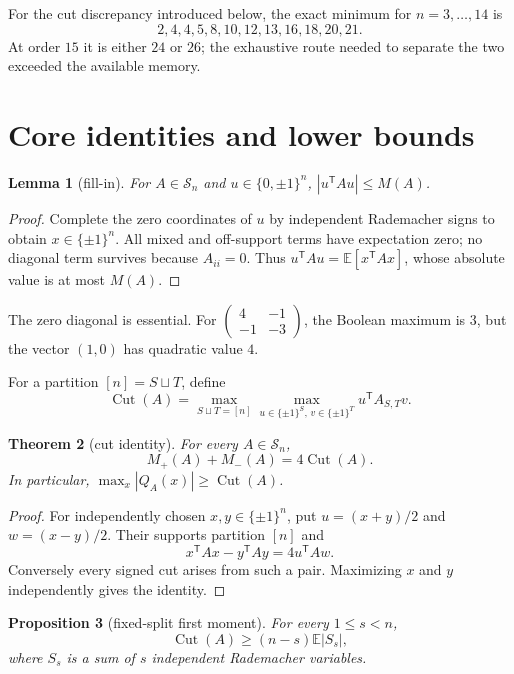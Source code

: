 \documentclass[11pt]{article}
\newtheorem{theorem}{Theorem}[section]
\newtheorem{proposition}[theorem]{Proposition}
\newtheorem{lemma}[theorem]{Lemma}
\theoremstyle{definition}
\theoremstyle{remark}
\newcommand{\Sn}{\mathcal S_n}
\newcommand{\E}{\mathbb E}
\newcommand{\Cut}{\operatorname{Cut}}
\begin{document}
For the cut discrepancy introduced below, the exact minimum for
$n=3,\ldots,14$ is
\[
 2,4,4,5,8,10,12,13,16,18,20,21.
\]
At order $15$ it is either $24$ or $26$; the exhaustive route needed to
separate the two exceeded the available memory.

\section{Core identities and lower bounds}

\begin{lemma}[fill-in]\label{lem:fill-in}
For $A\in\Sn$ and $u\in\{0,\pm1\}^n$,
$|u^{\mathsf T}Au|\le M(A)$.
\end{lemma}

\begin{proof}
Complete the zero coordinates of $u$ by independent Rademacher signs to
obtain $x\in\{\pm1\}^n$.  All mixed and off-support terms have expectation
zero; no diagonal term survives because $A_{ii}=0$.  Thus
$u^{\mathsf T}Au=\E[x^{\mathsf T}Ax]$, whose absolute value is at most
$M(A)$.
\end{proof}

The zero diagonal is essential.  For
$\left(\begin{smallmatrix}4&-1\\-1&-3\end{smallmatrix}\right)$, the Boolean
maximum is $3$, but the vector $(1,0)$ has quadratic value $4$.

For a partition $[n]=S\sqcup T$, define
\[
 \Cut(A)=\max_{S\sqcup T=[n]}
 \max_{u\in\{\pm1\}^S,\,v\in\{\pm1\}^T}
 u^{\mathsf T}A_{S,T}v.
\]

\begin{theorem}[cut identity]\label{thm:cut-identity}
For every $A\in\Sn$,
\[
 M_+(A)+M_-(A)=4\Cut(A).
\]
In particular,
$\max_x|Q_A(x)|\ge\Cut(A)$.
\end{theorem}

\begin{proof}
For independently chosen $x,y\in\{\pm1\}^n$, put
$u=(x+y)/2$ and $w=(x-y)/2$.  Their supports partition $[n]$ and
\[
 x^{\mathsf T}Ax-y^{\mathsf T}Ay=4u^{\mathsf T}Aw.
\]
Conversely every signed cut arises from such a pair.  Maximizing $x$ and $y$
independently gives the identity.
\end{proof}

\begin{proposition}[fixed-split first moment]\label{prop:first-moment}
For every $1\le s<n$,
\[
 \Cut(A)\ge(n-s)\E|S_s|,
\]
where $S_s$ is a sum of $s$ independent Rademacher variables.
\end{proposition}
\end{document}
